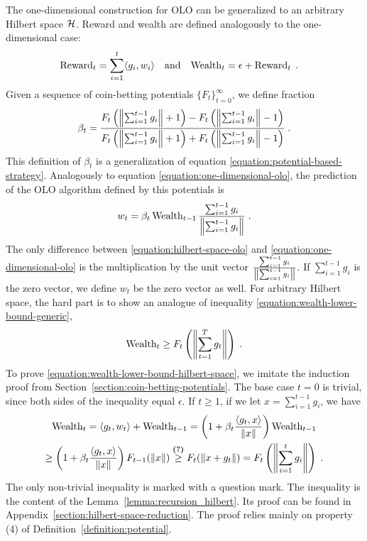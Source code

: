 The one-dimensional construction for OLO can be generalized to an arbitrary
Hilbert space $\mathcal{H}$. Reward and wealth are defined analogously
to the one-dimensional case:
\begin{align*}
\operatorname{Reward}_t &= \sum_{i=1}^t \langle g_i, w_i \rangle &
& \text{and} &
\operatorname{Wealth}_t &= \epsilon + \operatorname{Reward}_t \; .
\end{align*}
Given a sequence of coin-betting potentials $\{F_t\}_{t=0}^\infty$,
we define fraction
\begin{equation}
\label{equation:potential-based-strategy-hilbert-space}
\beta_t = \frac{F_t \left(\left\|{\sum_{i=1}^{t-1} g_i}\right\| + 1\right) - F_t\left(\left\|{\sum_{i=1}^{t-1} g_i}\right\| - 1 \right)}{F_t\left(\left\|{\sum_{i=1}^{t-1} g_i}\right\| + 1 \right) + F_t\left(\left\|{\sum_{i=1}^{t-1} g_i}\right\| - 1 \right)} \; .
\end{equation}
This definition of $\beta_t$ is a generalization of equation
\eqref{equation:potential-based-strategy}.  Analogously to equation
\eqref{equation:one-dimensional-olo}, the prediction of the OLO algorithm
defined by this potentials is
\begin{equation}
\label{equation:hilbert-space-olo}
w_t = \beta_t \operatorname{Wealth}_{t-1} \frac{\sum_{i=1}^{t-1} g_i}{\left\|{\sum_{i=1}^{t-1} g_i}\right\|}  \; .
\end{equation}
The only difference between \eqref{equation:hilbert-space-olo} and
\eqref{equation:one-dimensional-olo} is the multiplication by the unit vector
$\frac{\sum_{i=1}^{t-1} g_i}{\left\|{\sum_{i=1}^{t-1} g_i}\right\|}$. If $\sum_{i=1}^{t-1}
g_i$ is the zero vector, we define $w_t$ be the zero vector as well. For
arbitrary Hilbert space, the hard part is to show an analogue of
inequality \eqref{equation:wealth-lower-bound-generic},
\begin{equation}
\label{equation:wealth-lower-bound-hilbert-space}
\operatorname{Wealth}_t \ge F_t\left(\left\|{\sum_{t=1}^T g_t}\right\| \right) \; .
\end{equation}
To prove \eqref{equation:wealth-lower-bound-hilbert-space}, we imitate the induction
proof from Section~\ref{section:coin-betting-potentials}. The base case
$t=0$ is trivial, since both sides of the inequality equal $\epsilon$.
If $t \ge 1$, if we let $x = \sum_{i=1}^{t-1} g_i$, we have
\begin{multline*}
\operatorname{Wealth}_t
= \langle g_t, w_t \rangle + \operatorname{Wealth}_{t-1}
= \left(1 + \beta_t \frac{\langle g_t, x \rangle}{\|x\|} \right) \operatorname{Wealth}_{t-1} \\
\ge \left(1 + \beta_t \frac{\langle g_t, x \rangle}{\|x\|} \right) F_{t-1}(\left\|{x}\right\|)
\stackrel{\text{\textbf{(?)}}}{\ge} F_t(\left\|{x + g_t}\right\|)
= F_t\left(\left\|{\sum_{i=1}^t g_i}\right\| \right) \; .
\end{multline*}
The only non-trivial inequality is marked with a question mark. The inequality
is the content of the Lemma~\ref{lemma:recursion_hilbert}. Its proof can be
found in Appendix~\ref{section:hilbert-space-reduction}. The proof relies
mainly on property (4) of Definition~\ref{definition:potential}.

